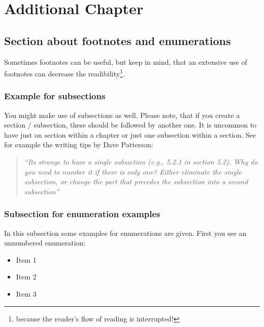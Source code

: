 
\chapter{Additional Chapter} %
\label{cha:additional_chapter}

\section{Section about footnotes and enumerations} %
\label{sec:section_about_footnotes_and_enumerations}

Sometimes footnotes can be useful, but keep in mind, that an extensive use of footnotes can decrease the readibility\footnote{ because the reader's flow of reading is interrupted!}. 

\subsection{Example for subsections} %
\label{sub:example_for_subsections}

You might make use of subsections as well. Please note, that if you create a section / subsection, these should be followed by another one. It is uncommon to have just on section within a chapter or just one subsection within a section. See for example the writing tips by Dave Patterson: 

\begin{quotation}
	\emph{``Its strange to have a single subsection (e.g., 5.2.1 in section 5.2). Why do you need to number it if there is only one? Either eliminate the single subsection, or change the part that precedes the subsection into a second subsection''}
	\citep{Patterson2013}
\end{quotation} 



\subsection{Subsection for enumeration examples} %
\label{sub:subsection_for_enumeration_examples}

In this subsection some examples for enumerations are given. First you see an unnumbered enumeration:

\begin{itemize}
	\item Item 1
	\item Item 2
	\item Item 3
\end{itemize}

